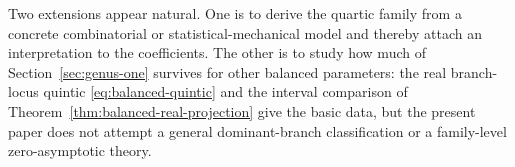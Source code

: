 Two extensions appear natural.
One is to derive the quartic family from a concrete combinatorial or statistical-mechanical model and thereby attach an interpretation to the coefficients.
The other is to study how much of Section~\ref{sec:genus-one} survives for other balanced parameters: the real branch-locus quintic \eqref{eq:balanced-quintic} and the interval comparison of Theorem~\ref{thm:balanced-real-projection} give the basic data, but the present paper does not attempt a general dominant-branch classification or a family-level zero-asymptotic theory.
